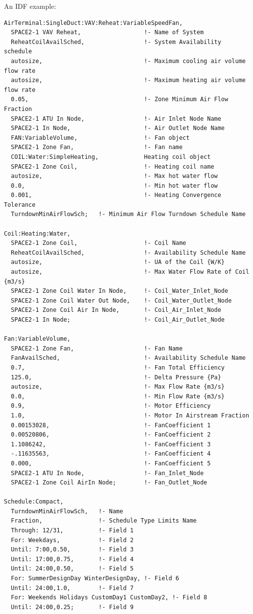 An IDF example:

\begin{lstlisting}
AirTerminal:SingleDuct:VAV:Reheat:VariableSpeedFan,
  SPACE2-1 VAV Reheat,                  !- Name of System
  ReheatCoilAvailSched,                 !- System Availability schedule
  autosize,                             !- Maximum cooling air volume flow rate
  autosize,                             !- Maximum heating air volume flow rate
  0.05,                                 !- Zone Minimum Air Flow Fraction
  SPACE2-1 ATU In Node,                 !- Air Inlet Node Name
  SPACE2-1 In Node,                     !- Air Outlet Node Name
  FAN:VariableVolume,                   !- Fan object
  SPACE2-1 Zone Fan,                    !- Fan name
  COIL:Water:SimpleHeating,             Heating coil object
  SPACE2-1 Zone Coil,                   !- Heating coil name
  autosize,                             !- Max hot water flow
  0.0,                                  !- Min hot water flow
  0.001,                                !- Heating Convergence Tolerance
  TurndownMinAirFlowSch;   !- Minimum Air Flow Turndown Schedule Name

Coil:Heating:Water,
  SPACE2-1 Zone Coil,                   !- Coil Name
  ReheatCoilAvailSched,                 !- Availability Schedule Name
  autosize,                             !- UA of the Coil {W/K}
  autosize,                             !- Max Water Flow Rate of Coil {m3/s}
  SPACE2-1 Zone Coil Water In Node,     !- Coil_Water_Inlet_Node
  SPACE2-1 Zone Coil Water Out Node,    !- Coil_Water_Outlet_Node
  SPACE2-1 Zone Coil Air In Node,       !- Coil_Air_Inlet_Node
  SPACE2-1 In Node;                     !- Coil_Air_Outlet_Node

Fan:VariableVolume,
  SPACE2-1 Zone Fan,                    !- Fan Name
  FanAvailSched,                        !- Availability Schedule Name
  0.7,                                  !- Fan Total Efficiency
  125.0,                                !- Delta Pressure {Pa}
  autosize,                             !- Max Flow Rate {m3/s}
  0.0,                                  !- Min Flow Rate {m3/s}
  0.9,                                  !- Motor Efficiency
  1.0,                                  !- Motor In Airstream Fraction
  0.00153028,                           !- FanCoefficient 1
  0.00520806,                           !- FanCoefficient 2
  1.1086242,                            !- FanCoefficient 3
  -.11635563,                           !- FanCoefficient 4
  0.000,                                !- FanCoefficient 5
  SPACE2-1 ATU In Node,                 !- Fan_Inlet_Node
  SPACE2-1 Zone Coil AirIn Node;        !- Fan_Outlet_Node

Schedule:Compact,
  TurndownMinAirFlowSch,   !- Name
  Fraction,                !- Schedule Type Limits Name
  Through: 12/31,          !- Field 1
  For: Weekdays,           !- Field 2
  Until: 7:00,0.50,        !- Field 3
  Until: 17:00,0.75,       !- Field 4
  Until: 24:00,0.50,       !- Field 5
  For: SummerDesignDay WinterDesignDay, !- Field 6
  Until: 24:00,1.0,        !- Field 7
  For: Weekends Holidays CustomDay1 CustomDay2, !- Field 8
  Until: 24:00,0.25;       !- Field 9
\end{lstlisting}

